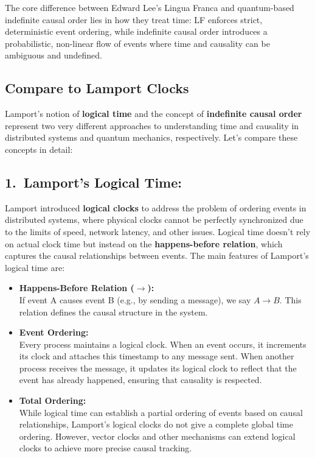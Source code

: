 \documentclass[../../../OAE-SPEC-MAIN.tex]{subfiles}
\begin{document}
The core difference between Edward Lee’s Lingua Franca and quantum-based indefinite causal order lies in how they treat time: LF enforces strict, deterministic event ordering, while indefinite causal order introduces a probabilistic, non-linear flow of events where time and causality can be ambiguous and undefined.

\subsection{Compare to Lamport Clocks}

Lamport’s notion of \textbf{logical time} and the concept of \textbf{indefinite causal order} represent two very different approaches to understanding time and causality in distributed systems and quantum mechanics, respectively. Let's compare these concepts in detail:

\subsection*{1.\ Lamport’s Logical Time:}

Lamport introduced \textbf{logical clocks} to address the problem of ordering events in distributed systems, where physical clocks cannot be perfectly synchronized due to the limits of speed, network latency, and other issues. Logical time doesn't rely on actual clock time but instead on the \textbf{happens-before relation}, which captures the causal relationships between events. The main features of Lamport’s logical time are:

\begin{itemize}[leftmargin=1.5em]
\item \textbf{Happens-Before Relation (\(\rightarrow\)):}\\
  If event A causes event B (e.g., by sending a message), we say \(A \rightarrow B\). This relation defines the causal structure in the system.
\item \textbf{Event Ordering:}\\
  Every process maintains a logical clock. When an event occurs, it increments its clock and attaches this timestamp to any message sent. When another process receives the message, it updates its logical clock to reflect that the event has already happened, ensuring that causality is respected.
\item \textbf{Total Ordering:}\\
  While logical time can establish a partial ordering of events based on causal relationships, Lamport’s logical clocks do not give a complete global time ordering. However, vector clocks and other mechanisms can extend logical clocks to achieve more precise causal tracking.
\end{itemize}
\end{document}
